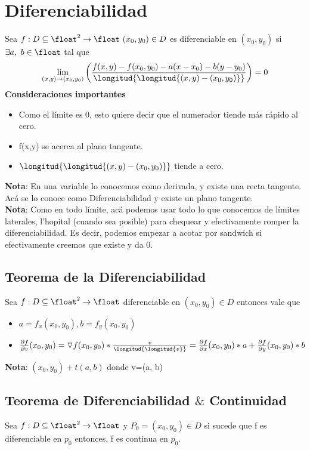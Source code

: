 \documentclass[10pt,a4paper]{article}
\begin{document}
\section*{Diferenciabilidad}
Sea $f:D \subseteq \float^{2} \rightarrow \float \ (x_{0}, y_{0}) \in D$ es diferenciable en $(x_{0}, y_{0})$ si $\exists a,\ b \in \float$ tal que 
\[\lim_{(x,y) \to (x_{0}, y_{0})} \left(\frac{f(x, y) - f(x_{0}, y_{0}) - a(x - x_{0}) - b(y - y_{0})}{\longitud{\longitud{(x, y) - (x_{0}, y_{0})}}} \right) = 0\]
\textbf{Consideraciones importantes}
\begin{itemize}
    \item Como el límite es 0, esto quiere decir que el numerador tiende más rápido al cero.
    \item f(x,y) se acerca al plano tangente.
    \item $\longitud{\longitud{(x,y) - (x_{0}, y_{0})}}$ tiende a cero. 
\end{itemize}
\textbf{Nota}: En una variable lo conocemos como derivada, y existe una recta tangente. Acá se lo conoce como Diferenciabilidad y existe un plano tangente. \\
\textbf{Nota}: Como en todo límite, acá podemos usar todo lo que conocemos de límites laterales, l'hopital (cuando sea posible) para chequear y efectivamente romper la diferenciabilidad. Es decir, podemos empezar a acotar por sandwich si efectivamente creemos que existe y da 0. \\
\subsection*{Teorema de la Diferenciabilidad}
Sea $f:D \subseteq \float^{2} \rightarrow \float$ diferenciable en $(x_{0}, y_{0}) \in D$ entonces vale que 
\begin{itemize}
    \item $a = f_{x}(x_{0}, y_{0}), b = f_{y}(x_{0}, y_{0})$
    \item $ \frac{\partial f}{\partial v}(x_{0},y_{0}) = \triangledown f (x_{0}, y_{0}) * \frac{v}{\longitud{\longitud{v}}} = \frac{\partial f}{\partial x}(x_{0}, y_{0}) * a + \frac{\partial f}{\partial y}(x_{0}, y_{0})*b$
\end{itemize} 
\textbf{Nota}: $(x_{0}, y_{0}) + t(a,b)$ donde v=(a, b) 
\subsection*{Teorema de Diferenciabilidad $\&$ Continuidad}
Sea $f:D\subseteq \float^{2} \rightarrow \float$ y $P_{0} = (x_{0}, y_{0}) \in D$ si sucede que f es diferenciable en $p_{0}$ entonces, f es continua en $p_{0}$.
\end{document}
